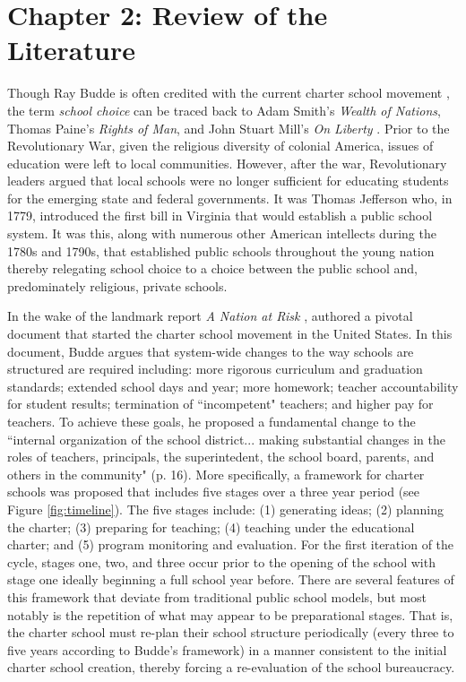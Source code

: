 \documentclass[letterpaper,12p,twoside]{article} %
\begin{document}
\cleardoublepage
\section{Chapter 2: Review of the Literature}

Though Ray Budde is often credited with the current charter school movement \cite{Kolderie2005}, the term \textit{school choice} can be traced back to Adam Smith's \textit{Wealth of Nations}, Thomas Paine's \textit{Rights of Man}, and John Stuart Mill's \textit{On Liberty} \cite{herbst2006}. Prior to the Revolutionary War, given the religious diversity of colonial America, issues of education were left to local communities. However, after the war, Revolutionary leaders argued that local schools were no longer sufficient for educating students for the emerging state and federal governments. It was Thomas Jefferson who, in 1779, introduced the first bill in Virginia that would establish a public school system. It was this, along with numerous other American intellects during the 1780s and 1790s, that established public schools throughout the young nation thereby relegating school choice to a choice between the public school and, predominately religious, private schools.

In the wake of the landmark report \textit{A Nation at Risk} \cite{nationatrisk},  authored a pivotal document that started the charter school movement in the United States. In this document, Budde argues that system-wide changes to the way schools are structured are required including: more rigorous curriculum and graduation standards; extended school days and year; more homework; teacher accountability for student results; termination of ``incompetent" teachers; and higher pay for teachers. To achieve these goals, he proposed a fundamental change to the ``internal organization of the school district... making substantial changes in the roles of teachers, principals, the superintedent, the school board, parents, and others in the community" (p. 16). More specifically, a framework for charter schools was proposed that includes five stages over a three year period (see Figure \ref{fig:timeline}). The five stages include: (1) generating ideas; (2) planning the charter; (3) preparing for teaching; (4) teaching under the educational charter; and (5) program monitoring and evaluation. For the first iteration of the cycle, stages one, two, and three occur prior to the opening of the school with stage one ideally beginning a full school year before. There are several features of this framework that deviate from traditional public school models, but most notably is the repetition of what may appear to be preparational stages. That is, the charter school must re-plan their school structure periodically (every three to five years according to Budde's framework) in a manner consistent to the initial charter school creation, thereby forcing a re-evaluation of the school bureaucracy.
\end{document}
